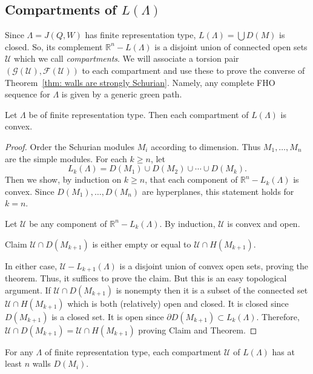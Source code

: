 \documentclass[ALCO,ThmDefs,Unicode,epreuves]{cedram}
\newcommand{\field}[1]{\mathbb{#1}}
\newcommand{\RR}{\ensuremath{{\field{R}}}}
\newcommand{\cF}{\ensuremath{{\mathcal{F}}}}
\newcommand{\cG}{\ensuremath{{\mathcal{G}}}}
\newcommand{\cU}{\ensuremath{{\mathcal{U}}}}
\begin{document}
\subsection{Compartments of \texorpdfstring{$L(\Lambda)$}{L(Lambda)}}
\label{sec33}


Since $\Lambda=J(Q,W)$ has finite representation type, $L(\Lambda)=\bigcup D(M)$ is closed. So, its complement $\RR^n-L(\Lambda)$ is a disjoint union of connected open sets $\cU$ which we call \emph{compartments}. We will associate a torsion pair $(\cG(\cU),\cF(\cU))$ to each compartment and use these to prove the converse of Theorem~\ref{thm: walls are strongly Schurian}. Namely, any complete FHO sequence for $\Lambda$ is given by a generic green path.



\begin{theo}
Let $\Lambda$ be of finite representation type. Then each compartment of $L(\Lambda)$ is convex.
\end{theo}

\begin{proof}
Order the Schurian modules $M_i$ according to dimension. Thus $M_1,\ldots,M_n$ are the simple modules. For each $k\ge n$, let 
\[
L_k(\Lambda)=D(M_1)\cup D(M_2)\cup\cdots\cup D(M_k).
\]
Then we show, by induction on $k\ge n$, that each component of $\RR^n-L_k(\Lambda)$ is convex. Since $D(M_1),\ldots,D(M_n)$ are hyperplanes, this statement holds for $k=n$.

Let $\cU$ be any component of $\RR^n-L_k(\Lambda)$. By induction, $\cU$ is convex and open.


\begin{enonce*}{Claim}
{$\cU\cap D(M_{k+1})$ is either empty or equal to $\cU\cap H(M_{k+1})$.} %
\end{enonce*}

In either case, $\cU-L_{k+1}(\Lambda)$ is a disjoint union of convex open sets, proving the theorem. Thus, it suffices to prove the claim. But this is an easy topological argument. If $\cU\cap D(M_{k+1})$ is nonempty then it is a subset of the connected set $\cU\cap H(M_{k+1})$ which is both (relatively) open and closed. It is closed since $D(M_{k+1})$ is a closed set. It is open since $\partial D(M_{k+1})\subset L_k(\Lambda)$. Therefore, $\cU\cap D(M_{k+1})=\cU\cap H(M_{k+1})$ proving Claim and Theorem.
\end{proof}

\begin{lemm}
For any $\Lambda$ of finite representation type, each compartment $\cU$ of $L(\Lambda)$ has at least $n$ walls $D(M_i)$.
\end{lemm}
\end{document}
